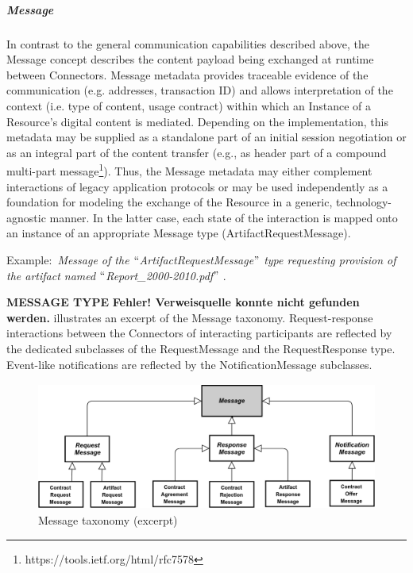 \subparagraph*{Message}
In contrast to the general communication capabilities described above, the Message concept describes the content payload being exchanged at runtime between Connectors. Message metadata provides traceable evidence of the communication (e.g. addresses, transaction ID) and allows interpretation of the context (i.e. type of content, usage contract) within which an Instance of a Resource’s digital content is mediated. Depending on the implementation, this metadata may be supplied as a standalone part of an initial session negotiation or as an integral part of the content transfer (e.g., as header part of a compound multi-part message\footnote{https://tools.ietf.org/html/rfc7578 }). Thus, the Message metadata may either complement interactions of legacy application protocols or may be used independently as a foundation for modeling the exchange of the Resource in a generic, technology-agnostic manner. In the latter case, each state of the interaction is mapped onto an instance of an appropriate Message type (ArtifactRequestMessage). 

Example:\  \textit{Message of the $``$ArtifactRequestMessage$"$  type requesting provision of the artifact named $``$Report\_2000-2010.pdf$"$ }. 

\textbf{MESSAGE TYPE }\textbf{Fehler! Verweisquelle konnte nicht gefunden werden.} illustrates an excerpt of the Message taxonomy. Request-response interactions between the Connectors of interacting participants are reflected by the dedicated subclasses of the RequestMessage and the RequestResponse type. Event-like notifications are reflected by the NotificationMessage subclasses.




\begin{figure}[H]
	\begin{Center}
		\includegraphics[width=4.5in,height=1.65in]{./media/image42.png}
		\caption{Message taxonomy (excerpt)}
		\label{fig:Message_taxonomy_excerpt}
	\end{Center}
\end{figure}


